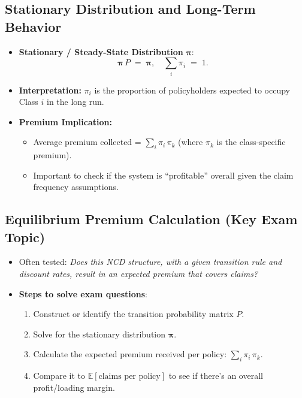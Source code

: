 \documentclass[13pt,a4paper]{article}
\begin{document}
\subsection{Stationary Distribution and Long-Term Behavior}
\begin{itemize}
  \item \textbf{Stationary / Steady-State Distribution} \(\boldsymbol{\pi}\):
  \[
    \boldsymbol{\pi}\,P \;=\; \boldsymbol{\pi}, 
    \quad
    \sum_{i} \pi_i \;=\; 1.
  \]
  \item \textbf{Interpretation:} \(\pi_i\) is the proportion of policyholders expected to occupy Class \(i\) in the long run.
  \item \textbf{Premium Implication:} 
  \begin{itemize}
    \item Average premium collected = \(\sum_i \pi_i \, \pi_k\) (where \(\pi_k\) is the class-specific premium).
    \item Important to check if the system is “profitable” overall given the claim frequency assumptions.
  \end{itemize}
\end{itemize}

\subsection{Equilibrium Premium Calculation (Key Exam Topic)}
\begin{itemize}
  \item Often tested: \emph{Does this NCD structure, with a given transition rule and discount rates, result in an expected premium that covers claims?}
  \item \textbf{Steps to solve exam questions}:
    \begin{enumerate}
      \item Construct or identify the transition probability matrix \(P\).
      \item Solve for the stationary distribution \(\boldsymbol{\pi}\).
      \item Calculate the expected premium received per policy: \(\sum_i \pi_i \, \pi_k\).
      \item Compare it to \(\mathbb{E}[\text{claims per policy}]\) to see if there's an overall profit/loading margin.
    \end{enumerate}
\end{itemize}
\end{document}
